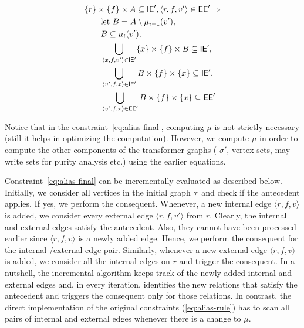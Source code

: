 \documentclass[12pt]{article}
\begin{document}
\begin{align}
\nonumber
& \{ r \} \times \{ f \} \times A \subseteq \mathsf{IE}', \langle r,f,v' \rangle \in \mathsf{EE}' \Rightarrow \\
\nonumber
& \qquad \text{let } B = A \setminus \mu_{i-1}(v'), \\
\nonumber
& \qquad B \subseteq \mu_i(v'),  \\
\nonumber
& \qquad \bigcup_{\langle x,f,v' \rangle \in \mathsf{IE}'} \{ x \} \times \{ f \} \times B \subseteq \mathsf{IE}', \\
\nonumber
& \qquad \bigcup_{\langle v',f,x \rangle \in \mathsf{IE}'} B \times \{ f \} \times \{ x \} \subseteq \mathsf{IE}', \\
& \qquad \bigcup_{\langle v',f,x \rangle \in \mathsf{EE}'} B \times \{ f \} \times \{  x \} \subseteq \mathsf{EE}' \label{eq:alias-final}
\end{align}

Notice that in the constraint~\ref{eq:alias-final}, computing $\mu$ is not strictly necessary (still it helps
in optimizing the computation). However, we compute $\mu$ in order to compute the other components 
of the transformer graphs (\eg{} $\sigma'$, vertex sets, may write sets for purity analysis etc.) using the 
earlier equations.

Constraint~\ref{eq:alias-final} can be incrementally evaluated as described below. 
Initially, we consider all vertices in the initial graph $\tau$ and check if the antecedent applies. 
If yes, we perform the consequent. 
Whenever, a new internal edge $\langle r,f,v \rangle$ is added, we consider every external edge
$\langle r,f,v' \rangle$ from $r$. Clearly, the internal and external edges satisfy the antecedent.
Also, they cannot have been processed earlier since $\langle r,f,v \rangle$ is a newly added edge.
Hence, we perform the consequent for the internal /external edge pair.
Similarly, whenever a new external edge $\langle r,f,v \rangle$ is added, 
we consider all the internal edges on $r$ and trigger the consequent. 
In a nutshell, the incremental algorithm keeps track of the newly added internal and external edges 
and, in every iteration, identifies the new relations that satisfy the antecedent and triggers the 
consequent only for those relations.
In contrast, the direct implementation of the original constraints (\ref{eq:alias-rule}) 
has to scan all pairs of internal and external edges whenever there is a change to $\mu$. 
\end{document}
